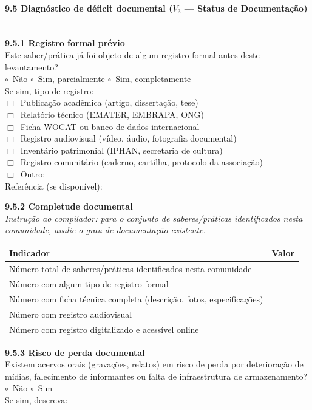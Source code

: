 \paragraph{9.5 Diagnóstico de déficit documental ($V_3$ --- Status de Documentação)}~\\[4pt]

\textbf{9.5.1 Registro formal prévio}\\[2pt]
Este saber/prática já foi objeto de algum registro formal antes deste levantamento?\\
$\circ$~Não \quad $\circ$~Sim, parcialmente \quad $\circ$~Sim, completamente\\[2pt]
Se sim, tipo de registro:\\
$\Box$~Publicação acadêmica (artigo, dissertação, tese)\\
$\Box$~Relatório técnico (EMATER, EMBRAPA, ONG)\\
$\Box$~Ficha WOCAT ou banco de dados internacional\\
$\Box$~Registro audiovisual (vídeo, áudio, fotografia documental)\\
$\Box$~Inventário patrimonial (IPHAN, secretaria de cultura)\\
$\Box$~Registro comunitário (caderno, cartilha, protocolo da associação)\\
$\Box$~Outro: \dotfill\\[2pt]
Referência (se disponível): \dotfill

\medskip\noindent\textbf{9.5.2 Completude documental}\\[2pt]
\emph{Instrução ao compilador: para o conjunto de saberes/práticas identificados nesta comunidade, avalie o grau de documentação existente.}

{
\begin{longtable}[]{@{}p{9cm}c@{}}
\toprule\noalign{}
Indicador & Valor \\
\midrule\noalign{}
\endhead
\bottomrule\noalign{}
\endlastfoot
Número total de saberes/práticas identificados nesta comunidade & \\
Número com algum tipo de registro formal & \\
Número com ficha técnica completa (descrição, fotos, especificações) & \\
Número com registro audiovisual & \\
Número com registro digitalizado e acessível online & \\
\end{longtable}
}

\medskip\noindent\textbf{9.5.3 Risco de perda documental}\\[2pt]
Existem acervos orais (gravações, relatos) em risco de perda por deterioração de mídias, falecimento de informantes ou falta de infraestrutura de armazenamento?\\
$\circ$~Não \quad $\circ$~Sim\\[2pt]
Se sim, descreva: \dotfill

